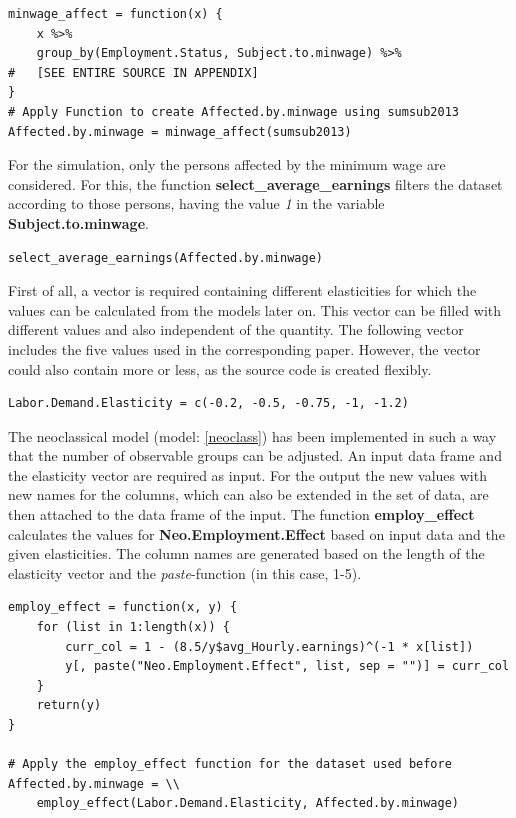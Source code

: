 \documentclass[a4paper]{article}
\begin{document}
\begin{lstlisting}
minwage_affect = function(x) {
    x %>% 
    group_by(Employment.Status, Subject.to.minwage) %>% 
#	[SEE ENTIRE SOURCE IN APPENDIX]
}
# Apply Function to create Affected.by.minwage using sumsub2013
Affected.by.minwage = minwage_affect(sumsub2013)
\end{lstlisting}
For the simulation, only the persons affected by the minimum wage are considered. For this, the function \textbf{select\_average\_earnings} filters the dataset  according to those persons, having the value \textit{1} in the variable \textbf{Subject.to.minwage}.
\begin{lstlisting}
select_average_earnings(Affected.by.minwage)
\end{lstlisting}
First of all, a vector is required containing different elasticities for which the values can be calculated from the models later on. This vector can be filled with different values and also independent of the quantity. The following vector includes the five values used in the corresponding paper. However, the vector could also contain more or less, as the source code is created flexibly.
\begin{lstlisting}
Labor.Demand.Elasticity = c(-0.2, -0.5, -0.75, -1, -1.2)
\end{lstlisting}
The neoclassical model (model: \ref{neoclass}) has been implemented in such a way that the number of observable groups can be adjusted. An input data frame and the elasticity vector are required as input. For the output the new values with new names for the columns, which can also be extended in the set of data, are then attached to the data frame of the input. The function \textbf{employ\_effect} calculates the values for \textbf{Neo.Employment.Effect} based on input data and the given elasticities. The column names are generated based on the length of the elasticity vector and the \textit{paste}-function (in this case, 1-5).
\begin{lstlisting}
employ_effect = function(x, y) {
    for (list in 1:length(x)) {
        curr_col = 1 - (8.5/y$avg_Hourly.earnings)^(-1 * x[list])
        y[, paste("Neo.Employment.Effect", list, sep = "")] = curr_col
    }
    return(y)
}

# Apply the employ_effect function for the dataset used before
Affected.by.minwage = \\
	employ_effect(Labor.Demand.Elasticity, Affected.by.minwage)
\end{lstlisting}
\end{document}
